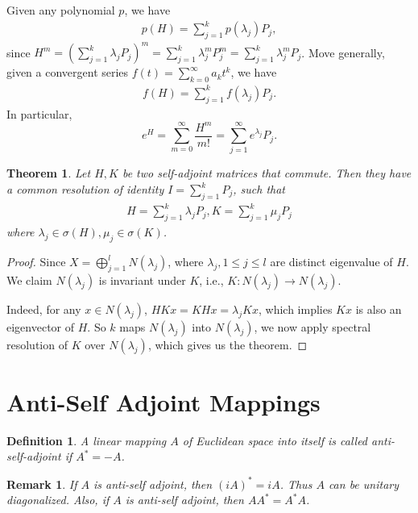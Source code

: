 \documentclass[11pt]{book}
\newtheorem{definition}{Definition}[chapter]
\newtheorem{theorem}{Theorem}[chapter]
\newtheorem{remark}{Remark}[chapter]
\theoremstyle{definition}
\numberwithin{equation}{chapter}
\begin{document}
\medskip

Given any polynomial $p$, we have
\begin{align*}
    p(H) = \sum^k_{j=1} p\left(\lambda_j\right) P_j,
\end{align*}
since $H^m = \left(\sum^k_{j=1} \lambda_j P_j\right)^m = \sum^k_{j=1} \lambda_j^m P_j^m = \sum^k_{j=1} \lambda_j^m P_j$. Move generally, given a convergent series $f(t) = \sum^\infty_{k=0} a_k t^k$, we have 
\begin{align*}
    f(H) = \sum^k_{j=1} f\left(\lambda_j\right) P_j.
\end{align*}
In particular, 
$$e^H = \sum^\infty_{m=0}\frac{H^m}{m!} = \sum^\infty_{j=1} e^{\lambda_j} P_j.$$

\medskip

\begin{theorem}
Let $H, K$ be two self-adjoint matrices that commute. Then they have a common resolution of identity $I = \sum^k_{j=1} P_j$, such that
\begin{align*}
    H = \sum^k_{j=1} \lambda_j P_j, K = \sum^k_{j=1} \mu_j P_j
\end{align*}
where $\lambda_j\in\sigma(H), \mu_j\in\sigma(K)$.
\end{theorem}
\begin{proof}
Since $X = \bigoplus^l_{j=1} N\left(\lambda_j\right)$, where $\lambda_j, 1\leq j\leq l$ are distinct eigenvalue of $H$. We claim $N\left(\lambda_j\right)$ is invariant under $K$, i.e., $K: N\left(\lambda_j\right) \to N\left(\lambda_j\right)$. 

Indeed, for any $x\in N\left(\lambda_j\right)$, $HKx = KH x = \lambda_j Kx$, which implies $Kx$ is also an eigenvector of $H$. So $k$ maps $N\left(\lambda_j\right)$ into $N\left(\lambda_j\right)$, we now apply spectral resolution of $K$ over $N\left(\lambda_j\right)$, which gives us the theorem.
\end{proof}

\medskip

\section{Anti-Self Adjoint Mappings}
\begin{definition}
A linear mapping $A$ of Euclidean space into itself is called anti-self-adjoint if $A^* = -A$.
\end{definition}
\begin{remark}
If $A$ is anti-self adjoint, then $(iA)^* = iA$. Thus $A$ can be unitary diagonalized. Also, if $A$ is anti-self adjoint, then $AA^* = A^* A$.
\end{remark}
\end{document}
